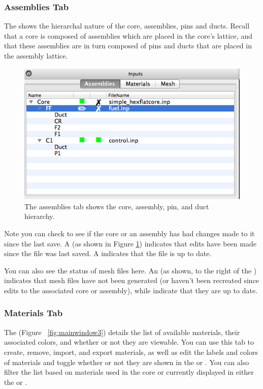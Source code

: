 \subsubsection{Assemblies Tab}
The  shows the hierarchal nature of the core, assemblies, pins and ducts.  Recall that a core is composed of assemblies which are placed in the core's lattice, and that these assemblies are in turn composed of pins and ducts that are placed in the assembly lattice.

\begin{figure}[H]
	\begin{center}
		\includegraphics[width=0.5\linewidth]{Images/assemblies-tab.png}
		\caption{The assemblies tab shows the core, assembly, pin, and duct hierarchy.}
		\label{fig:mainwindow2}
	\end{center}
\end{figure}

Note you can check to see if the core or an assembly has had changes made to it since the last save.  A  (as shown in Figure \ref{fig:mainwindow2}) indicates that edits have been made since the file was last saved.  A  indicates that the file is up to date.

You can also see the status of mesh files here.  An  (as shown, to the right of the ) indicates that mesh files have not been generated (or haven't been recreated since edits to the associated core or assembly), while  indicate that they are up to date.

\subsubsection{Materials Tab}
The  (Figure ~\ref{fig:mainwindow3}) details the list of available materials, their associated colors, and whether or not they are viewable.  You can use this tab to create, remove, import, and export materials, as well as edit the labels and colors of materials and toggle whether or not they are shown in the  or .  You can also filter the list based on materials used in the core or currently displayed in either the  or .

